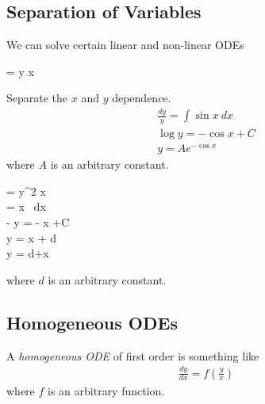 \subsection{Separation of Variables}
We can solve certain linear and non-linear ODEs 
\begin{nex}
	\item
	\begin{itemal}
	 = y \sin x  
	\end{itemal}
	Separate the $x$ and $y$ dependence.
	\begin{align*}
	\frac{dy} y = \int \sin x ~dx \\
	\log y = - \cos x +C \\
	y = Ae^{-\cos x}
	\end{align*}
	where $A$ is an arbitrary constant.
	\item
	\begin{itemal}
		 = y^2 \sin x \\
		\int {} = \int \sin x~ dx \\
		-  y = - \cos x +C \\
		 y = \cos x + d \\
		y =  {d+\cos x}
	\end{itemal}
	where $d$ is an arbitrary constant.
\end{nex}

\subsection{Homogeneous ODEs}
\begin{df}
	A \emph{homogeneous ODE} of first order is something like
	\begin{align*}
	\frac{dy}{dx} = f\left( \frac y x\right)
	\end{align*}
	where $f$ is an arbitrary function.
\end{df}

